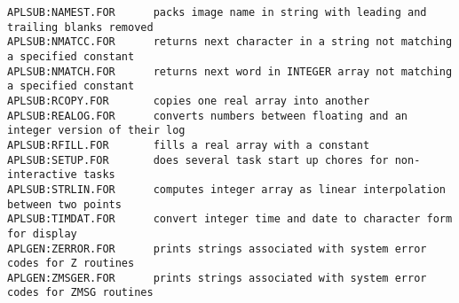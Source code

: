 \begin{verbatim}
APLSUB:NAMEST.FOR      packs image name in string with leading and trailing blanks removed
APLSUB:NMATCC.FOR      returns next character in a string not matching a specified constant
APLSUB:NMATCH.FOR      returns next word in INTEGER array not matching a specified constant
APLSUB:RCOPY.FOR       copies one real array into another
APLSUB:REALOG.FOR      converts numbers between floating and an integer version of their log
APLSUB:RFILL.FOR       fills a real array with a constant
APLSUB:SETUP.FOR       does several task start up chores for non-interactive tasks
APLSUB:STRLIN.FOR      computes integer array as linear interpolation between two points
APLSUB:TIMDAT.FOR      convert integer time and date to character form for display
APLGEN:ZERROR.FOR      prints strings associated with system error codes for Z routines
APLGEN:ZMSGER.FOR      prints strings associated with system error codes for ZMSG routines
\end{verbatim}
 
